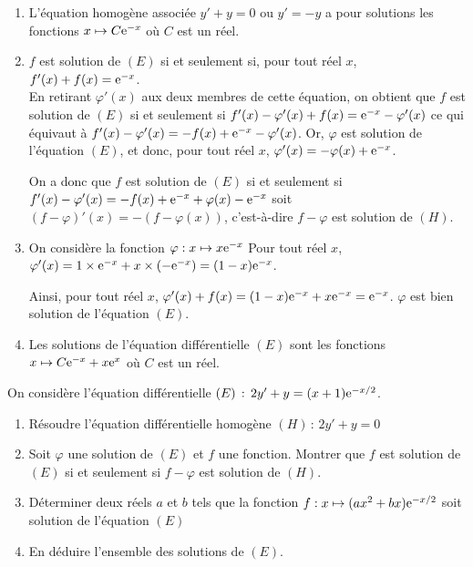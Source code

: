 \documentclass[11pt,fleqn, openany]{book} %
\begin{document}
\begin{solution}\hspace{0pt}

\begin{enumerate}\item L'équation homogène associée \(y'+y=0\) ou \(y'=-y\) a pour solutions les fonctions \(x\mapsto C\mathrm{e}^{-x}\) où \(C\) est un réel.

	\item \(f\) est solution de \((E)\) si et seulement si, pour tout réel \(x\), \(f'(x)+f(x)=\mathrm{e}^{-x}\). \\ En retirant \(\varphi'(x)\) aux deux membres de cette équation, on obtient que \(f\) est solution de \((E)\) si et seulement si \(f'(x)-\varphi '(x)+f(x)=\mathrm{e}^{-x}-\varphi '(x)\) ce qui équivaut à \(f'(x)-\varphi '(x)=-f(x)+\mathrm{e}^{-x}-\varphi '(x)\). Or, \(\varphi\) est solution de l'équation \((E)\), et donc, pour tout réel \(x\), \(\varphi' (x) = -\varphi (x)+\mathrm{e}^{-x}\).

	On a donc que \(f\) est solution de \((E)\) si et seulement si \(f'(x)-\varphi '(x)=-f(x)+\mathrm{e}^{-x}+\varphi (x)-\mathrm{e}^{-x}\) soit \((f-\varphi)'(x) = - (f-\varphi(x))\), c'est-à-dire \(f-\varphi\) est solution de \((H)\).
\item On considère la fonction \(\varphi:x\mapsto x\mathrm{e}^{-x}\) Pour tout réel \(x\), $\varphi'(x)=1 \times \mathrm{e}^{-x}+x\times (-\mathrm{e}^{-x})=(1-x)\mathrm{e}^{-x}$.

Ainsi, pour tout réel \(x\), $\varphi'(x)+f(x)=(1-x)\mathrm{e}^{-x}+x\mathrm{e}^{-x}=\mathrm{e}^{-x}$. \(\varphi\) est bien solution de l'équation \((E)\).
\item  Les solutions de l'équation différentielle \((E)\) sont les fonctions \(x\mapsto C\mathrm{e}^{-x}+x\mathrm{e}^{x}\) où \(C\) est un réel.\end{enumerate}

 \end{solution}
 
 

\begin{exercise}On considère l'équation différentielle $(E)\, :\, 2y'+y=(x+1)\mathrm{e}^{-x/2}$.
\begin{enumerate}
\item Résoudre l'équation différentielle homogène $(H) \,:\, 2y'+y=0$
\item Soit $\varphi$ une solution de $(E)$ et $f$ une fonction. Montrer que $f$ est solution de $(E)$ si et seulement si $f-\varphi$ est solution de $(H)$.
\item Déterminer deux réels $a$ et $b$ tels que la fonction $f:x\mapsto (ax^2+bx)\mathrm{e}^{-x/2}$ soit solution de l'équation $(E)$
\item En déduire l'ensemble des solutions de $(E)$.
\end{enumerate}\end{exercise}
\end{document}
